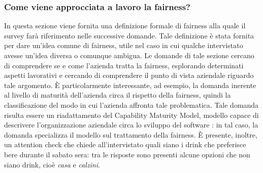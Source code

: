 \subsubsection{Come viene approcciata a lavoro la fairness?}

In questa sezione viene fornita una definizione formale di fairness alla quale il survey farà riferimento nelle successive domande. Tale definizione è stata fornita per dare un'idea comune di fairness, utile nel caso in cui qualche intervistato avesse un'idea diversa o comunque ambigua. Le domande di tale sezione cercano di comprendere se e come l'azienda tratta la fairness, esplorando determinati aspetti lavorativi e cercando di comprendere il punto di vista aziendale riguardo tale argomento. È particolarmente interessante, ad esempio, la domanda inerente al livello di maturità dell'azienda circa il rispetto della fairness, quindi la classificazione del modo in cui l'azienda affronta tale problematica. Tale domanda risulta essere un riadattamento del Capability Maturity Model, modello capace di descrivere l'organizzazione aziendale circa lo sviluppo del software \cite{cmm}: in tal caso, la domanda specializza il modello sul trattamento della fairness.  È presente, inoltre, un attention check che chiede all'intervistato quali siano i drink che preferisce bere durante il sabato sera: tra le risposte sono presenti alcune opzioni che non siano drink, cioè \emph{casa} e \emph{calzini}.

